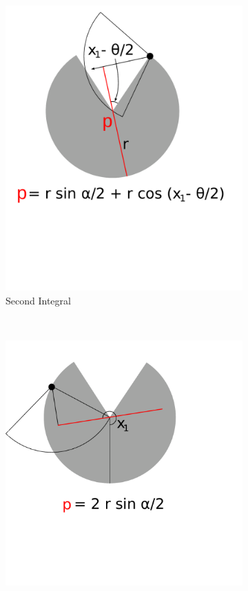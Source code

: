 \documentclass[a4paper,10pt,reqno,oneside]{amsart}
\begin{document}
\begin{figure}[t]
	\begin{subfigure}[t]{0.45\textwidth}
                \centering
		\includegraphics[width=1\textwidth]{imgs/secondIntegral.pdf}
                \caption{Second Integral}
                \label{f:secondInt}
        \end{subfigure}%
	~ 
	\begin{subfigure}[t]{0.45\textwidth}
                \centering
		\includegraphics[width=1\textwidth]{imgs/thirdIntegral.pdf}

\end{subfigure}
\end{figure}
\end{document}
